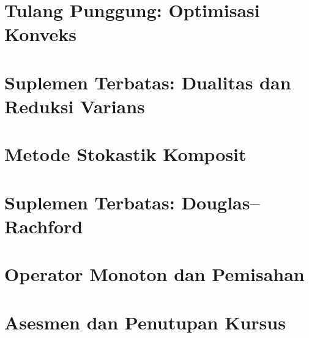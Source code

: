 \documentclass[11pt,a4paper,oneside,openany]{book}
\begin{document}
\tableofcontents
\OEndStructure

\mainmatter
{}
\part{Tulang Punggung: Optimisasi Konveks}









\OEndStructure

\part{Suplemen Terbatas: Dualitas dan Reduksi Varians}


\OEndStructure

\part{Metode Stokastik Komposit}

\OEndStructure

\part{Suplemen Terbatas: Douglas--Rachford}

\OEndStructure

\part{Operator Monoton dan Pemisahan}

\OEndStructure

\part{Asesmen dan Penutupan Kursus}

\OEndStructure

\backmatter
{}
\printbibliography[heading=bibintoc,title={Referensi}]
\OEndStructure
\end{document}
